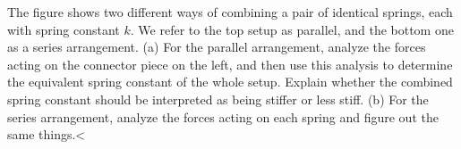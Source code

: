   The figure shows two different ways of combining a
pair of identical springs, each with spring constant $k$. We
refer to the top setup as parallel, and the bottom one as a
series arrangement.\hwendpart
 (a) For the parallel arrangement,
analyze the forces acting on the connector piece on the
left, and then use this analysis to determine the equivalent
spring constant of the whole setup. Explain whether the
combined spring constant should be interpreted as being
stiffer or less stiff.\hwendpart
 (b) For the series arrangement,
analyze the forces acting on each spring and figure
out the same things.<%
